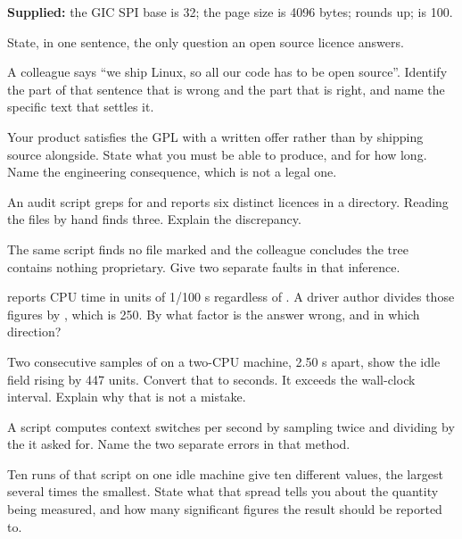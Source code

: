 \textbf{Supplied:} the GIC SPI base is 32; the page size is 4096 bytes; 
rounds up;  is 100.

\label{exb:q:1}

 State, in one sentence, the only question an open source licence answers. 

 A colleague says ``we ship Linux, so all our code has to be open source''. Identify the
part of that sentence that is wrong and the part that is right, and name the specific text that
settles it. 

 Your product satisfies the GPL with a written offer rather than by shipping source
alongside. State what you must be able to produce, and for how long. Name the engineering
consequence, which is not a legal one. 

 An audit script greps for  and reports six distinct licences
in a directory. Reading the files by hand finds three. Explain the discrepancy. 

 The same script finds no file marked  and the colleague concludes the
tree contains nothing proprietary. Give two separate faults in that inference. 

\label{exb:q:2}

  reports CPU time in units of 1/100 s regardless of . A
driver author divides those figures by , which is 250. By what factor is the answer wrong,
and in which direction? 

 Two consecutive samples of  on a two-CPU machine, 2.50 s apart, show the
idle field rising by 447 units. Convert that to seconds. It exceeds the wall-clock interval. Explain
why that is not a mistake. 

 A script computes context switches per second by sampling  twice and
dividing by the  it asked for. Name the two separate errors in that method. 

 Ten runs of that script on one idle machine give ten different values, the largest
several times the smallest. State what that spread tells you about the quantity being measured, and
how many significant figures the result should be reported to. 

